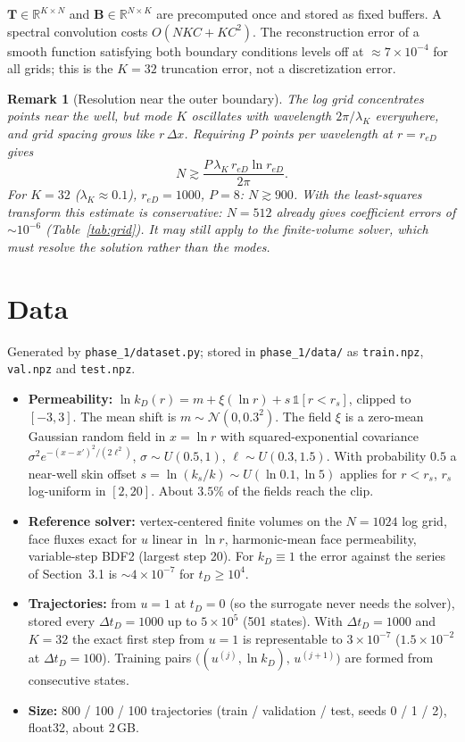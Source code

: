 \documentclass[11pt]{article}
\newtheorem{remark}{Remark}
\newcommand{\reD}{r_{eD}}
\begin{document}
$\mathbf T\in\mathbb{R}^{K\times N}$ and $\mathbf B\in\mathbb{R}^{N\times K}$ are precomputed once and stored as fixed
buffers. A spectral convolution costs $O(NKC + KC^2)$. The reconstruction error of a smooth function satisfying both
boundary conditions levels off at $\approx7\times10^{-4}$ for all grids; this is the $K=32$ truncation error, not a
discretization error.

\begin{remark}[Resolution near the outer boundary]
The log grid concentrates points near the well, but mode $K$ oscillates with wavelength $2\pi/\lambda_K$ everywhere, and
grid spacing grows like $r\,\Delta x$. Requiring $P$ points per wavelength at $r=\reD$ gives
\begin{equation}
  N \gtrsim \frac{P\,\lambda_K\,\reD\ln\reD}{2\pi}.
\end{equation}
For $K=32$ ($\lambda_K\approx0.1$), $\reD=1000$, $P=8$: $N\gtrsim 900$. With the least-squares transform this
estimate is conservative: $N=512$ already gives coefficient errors of $\sim10^{-6}$ (Table~\ref{tab:grid}).
It may still apply to the finite-volume solver, which must resolve the solution rather than the modes.
\end{remark}

\section{Data}
\label{sec:data}
Generated by \texttt{phase\_1/dataset.py}; stored in \texttt{phase\_1/data/} as \texttt{train.npz}, \texttt{val.npz} and \texttt{test.npz}.
\begin{itemize}
  \item \textbf{Permeability:} $\ln k_D(r) = m + \xi(\ln r) + s\,\mathbb 1[r<r_s]$, clipped to $[-3,3]$.
        The mean shift is $m\sim\mathcal N(0,0.3^2)$. The field $\xi$ is a zero-mean Gaussian random field in $x=\ln r$
        with squared-exponential covariance $\sigma^2 e^{-(x-x')^2/(2\ell^2)}$, $\sigma\sim U(0.5,1)$, $\ell\sim U(0.3,1.5)$.
        With probability $0.5$ a near-well skin offset $s=\ln(k_s/k)\sim U(\ln0.1,\ln5)$ applies for
        $r<r_s$, $r_s$ log-uniform in $[2,20]$. About $3.5\%$ of the fields reach the clip.
  \item \textbf{Reference solver:} vertex-centered finite volumes on the $N=1024$ log grid, face fluxes exact for
        $u$ linear in $\ln r$, harmonic-mean face permeability, variable-step BDF2 (largest step 20).
        For $k_D\equiv1$ the error against the series of Section~3.1 is $\sim4\times10^{-7}$ for $t_D\ge10^4$.
  \item \textbf{Trajectories:} from $u=1$ at $t_D=0$ (so the surrogate never needs the solver), stored every
        $\Delta t_D=1000$ up to $5\times10^5$ (501 states). With $\Delta t_D=1000$ and $K=32$ the exact first step from
        $u=1$ is representable to $3\times10^{-7}$ ($1.5\times10^{-2}$ at $\Delta t_D=100$).
        Training pairs $\big((u^{(j)},\ln k_D),\,u^{(j+1)}\big)$ are formed from consecutive states.
  \item \textbf{Size:} 800 / 100 / 100 trajectories (train / validation / test, seeds 0 / 1 / 2), float32, about 2\,GB.
\end{itemize}
\end{document}
